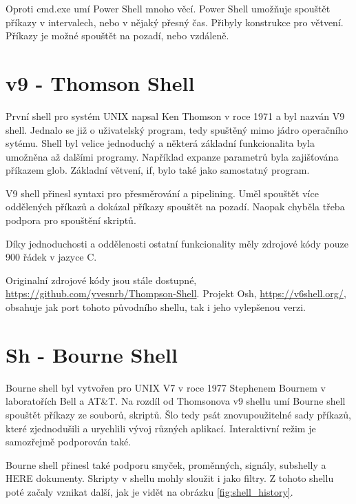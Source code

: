 \documentclass[thesis=M,czech]{FITthesis}[2012/06/26]
\begin{document}
Oproti cmd.exe umí Power Shell mnoho věcí. Power Shell umožňuje spouštět příkazy v intervalech, nebo v nějaký přesný čas. Přibyly konstrukce pro větvení. Příkazy je možné spouštět na pozadí, nebo vzdáleně.




\section{v9 - Thomson Shell}

První shell pro systém UNIX napsal Ken Thomson v roce 1971 a byl nazván V9 shell. Jednalo se již o uživatelský program, tedy spuštěný mimo jádro operačního sytému. Shell byl velice jednoduchý a některá základní funkcionalita byla umožněna až dalšími programy. Například expanze parametrů byla zajišťována příkazem glob. Základní větvení, if, bylo také jako samostatný program.

V9 shell přinesl syntaxi pro přesměrování a pipelining. Uměl spouštět více oddělených příkazů a dokázal příkazy spouštět na pozadí. Naopak chyběla třeba podpora pro spouštění skriptů. 

Díky jednoduchosti a oddělenosti ostatní funkcionality měly zdrojové kódy pouze 900 řádek v jazyce C.

Originalní zdrojové kódy jsou stále dostupné, \url{https://github.com/yvesnrb/Thompson-Shell}. Projekt Osh, \url{https://v6shell.org/}, obsahuje jak port tohoto původního shellu, tak i jeho vylepšenou verzi.



%
%
%
\section{Sh - Bourne Shell}

Bourne shell byl vytvořen pro UNIX V7 v roce 1977 Stephenem Bournem v laboratořích Bell a AT\&T. Na rozdíl od Thomsonova v9 shellu umí Bourne shell spouštět příkazy ze souborů, skriptů. Šlo tedy psát znovupoužitelné sady příkazů, které zjednodušili a urychlili vývoj různých aplikací. Interaktivní režim je samozřejmě podporován také.

Bourne shell přinesl také podporu smyček, proměnných, signály, subshelly a HERE dokumenty. Skripty v shellu mohly sloužit i jako filtry. Z tohoto shellu poté začaly vznikat další, jak je vidět na obrázku \ref{fig:shell_history}.
\end{document}
